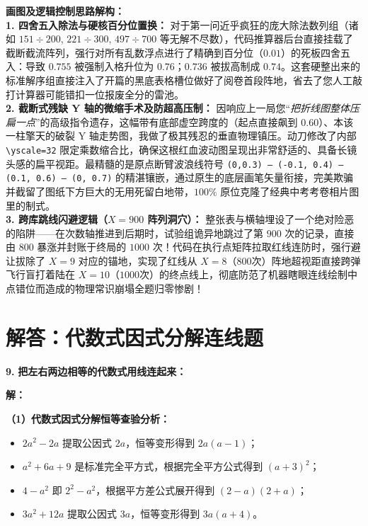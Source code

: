 \documentclass[12pt, a4paper]{ctexrep}
\begin{document}
\vspace{0.4cm}
{\small\color{blue!70!black}
\textbf{画图及逻辑控制思路解构：}\\
\textbf{1. 四舍五入除法与硬核百分位置换：} 对于第一问近乎疯狂的庞大除法数列组（诸如 $151 \div 200$, $221 \div 300$, $497 \div 700$ 等无解不尽数），代码推算器后台直接挂载了截断截流阵列，强行对所有乱数浮点进行了精确到百分位（$0.01$）的死板四舍五入：导致 $0.755$ 被强制入格升位为 $0.76$；$0.736$ 被拔高制成 $0.74$。这套硬整出来的标准解序组直接注入了开篇的黑底表格槽位做好了阅卷首段阵地，省去了您人工敲打计算器可能错扣一位报废全分的雷池。\\
\textbf{2. 截断式残缺 Y 轴的微缩手术及防超高压制：} 因响应上一局您“\textit{把折线图整体压扁一点}”的高级指令遗存，这幅带有底部虚空跨度的（起点直接飙到 $0.60$）、本该一柱擎天的破裂 Y 轴走势图，我做了极其残忍的垂直物理镇压。动刀修改了内部 \texttt{\textbackslash{}yscale=32} 限定乘数缩合比，确保这根红血波动图呈现出非常舒适的、具备长镜头感的扁平视距。最精髓的是原点断臂波浪线符号 \texttt{(0,0.3) -- (-0.1, 0.4) -- (0.1, 0.6) -- (0, 0.7)} 的精湛镶嵌，通过原生的底层画笔矢量衔接，完美欺骗并截留了图纸下方巨大的无用死留白地带，$100\%$ 原位克隆了经典中考考卷相片图里的制式。\\
\textbf{3. 跨库跳线闪避逻辑（$X=900$ 阵列洞穴）：} 整张表与横轴埋设了一个绝对险恶的陷阱——在次数轴推进到后期时，试验组诡异地跳过了第 $900$ 次的记录，直接由 $800$ 暴涨并封账于终局的 $1000$ 次！代码在执行点矩阵拉取红线连防时，强行避让拔除了 $X=9$ 对应的锚地，实现了红线从 $X=8$（$800$次）阵地超视距直接跨弹飞行盲打着陆在 $X=10$（$1000$次）的终点线上，彻底防范了机器瞎眼连线绘制中点错位而造成的物理常识崩塌全题归零惨剧！
}

\newpage

\section{解答：代数式因式分解连线题}

\vspace{0.6cm}

\textbf{\LARGE 9.} \textbf{把左右两边相等的代数式用线连起来：}

\vspace{0.6cm}
\textbf{解：}

\textbf{（1）代数式因式分解恒等查验分析：}
\begin{itemize}
    \item $2a^2 - 2a$ 提取公因式 $2a$，恒等变形得到 $2a(a - 1)$；
    \item $a^2 + 6a + 9$ 是标准完全平方式，根据完全平方公式得到 $(a + 3)^2$；
    \item $4 - a^2$ 即 $2^2 - a^2$，根据平方差公式展开得到 $(2 - a)(2 + a)$；
    \item $3a^2 + 12a$ 提取公因式 $3a$，恒等变形得到 $3a(a + 4)$。
\end{itemize}
\end{document}
